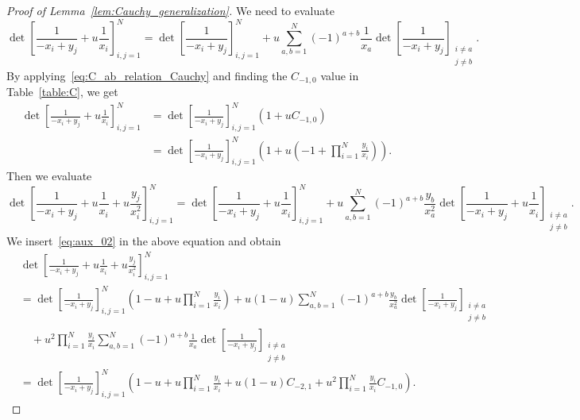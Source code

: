 \documentclass{article}
\numberwithin{equation}{section}
\begin{document}
\begin{proof}[Proof of Lemma~\ref{lem:Cauchy_generalization}]
We need to evaluate
\begin{equation*}
	\det\left[\frac{1}{-x_i+y_j} +u\frac{1}{x_i}\right]_{i,j=1}^N =\det\left[\frac{1}{-x_i+y_j}\right]_{i,j=1}^N + u\sum_{a,b=1}^N (-1)^{a+b}\frac{1}{x_a} \det\left[\frac{1}{-x_i+y_j}\right]_{\substack{i\ne a\\ j\ne b}}.
\end{equation*}
By applying~\eqref{eq:C_ab_relation_Cauchy} and finding the $C_{-1,0}$ value in Table~\ref{table:C}, we get
\begin{equation}
	\label{eq:aux_02}
	\begin{split}
	\det\left[\frac{1}{-x_i+y_j} +u\frac{1}{x_i}\right]_{i,j=1}^N 
	&=\det\left[\frac{1}{-x_i+y_j}\right]_{i,j=1}^N \left(1+uC_{-1,0}\right)\\
	&=\det\left[\frac{1}{-x_i+y_j}\right]_{i,j=1}^N  \left(1+ u\left(-1+\prod_{i=1}^N\frac{y_i}{x_i}\right)\right).
	\end{split}
\end{equation}
Then we evaluate
\begin{equation*}
	\det\left[  \frac{1}{-x_i+y_j} +u \frac{1}{x_i} +u \frac{y_j}{x_i^2} \right]_{i,j=1}^N = \det\left[\frac{1}{-x_i+y_j} +u\frac{1}{x_i}\right]_{i,j=1}^N
	+u\sum_{a,b=1}^N (-1)^{a+b}\frac{y_b}{x_a^2}\det\left[\frac{1}{-x_i+y_j} +u\frac{1}{x_i}\right]_{\substack{i\ne a\\ j\ne b}}.
\end{equation*}
We insert~\eqref{eq:aux_02} in the above equation and obtain
\begin{equation}
	\label{eq:aux_03}
	\begin{split}
		&\det\left[  \frac{1}{-x_i+y_j} +u \frac{1}{x_i} +u \frac{y_j}{x_i^2} \right]_{i,j=1}^N\\
		&= \det\left[\frac{1}{-x_i+y_j}\right]_{i,j=1}^N  \left(1- u+ u\prod_{i=1}^N\frac{y_i}{x_i}\right)
		+u(1-u)\sum_{a,b=1}^N (-1)^{a+b}\frac{y_b}{x_a^2}\det\left[\frac{1}{-x_i+y_j}\right]_{\substack{i\ne a\\ j\ne b}}\\
		&\quad +u^2\prod_{i=1}^N\frac{y_i}{x_i}\sum_{a,b=1}^N (-1)^{a+b}\frac{1}{x_a}\det\left[\frac{1}{-x_i+y_j}\right]_{\substack{i\ne a\\ j\ne b}}\\
		&=\det\left[\frac{1}{-x_i+y_j}\right]_{i,j=1}^N  \left(1- u+ u\prod_{i=1}^N\frac{y_i}{x_i}
		+u(1-u) C_{-2,1} + u^2\prod_{i=1}^N\frac{y_i}{x_i} C_{-1,0}\right).
	\end{split}
\end{equation}

\end{proof}
\end{document}

